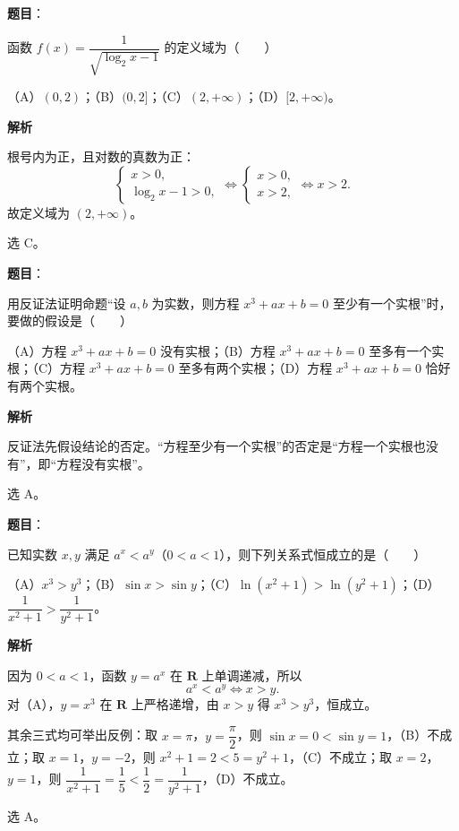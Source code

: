 \begin{answer}

\textbf{题目}：

函数 $f(x)=\dfrac1{\sqrt{\log_2x-1}}$ 的定义域为\mbox{（　　）}

（A）$(0,2)$；（B）$(0,2]$；（C）$(2,+\infty)$；（D）$[2,+\infty)$。

\textbf{解析}

根号内为正，且对数的真数为正：
\nopagebreak[4]
\[\begin{cases}x>0,\\[1mm]\log_2x-1>0,\end{cases}
\iff\begin{cases}x>0,\\x>2,\end{cases}\iff x>2 .\]
故定义域为 $(2,+\infty)$。

选 C。


\end{answer}
\begin{answer}

\textbf{题目}：

用反证法证明命题“设 $a,b$ 为实数，则方程 $x^3+ax+b=0$ 至少有一个实根”时，要做的假设是\mbox{（　　）}

（A）方程 $x^3+ax+b=0$ 没有实根；（B）方程 $x^3+ax+b=0$ 至多有一个实根；（C）方程 $x^3+ax+b=0$ 至多有两个实根；（D）方程 $x^3+ax+b=0$ 恰好有两个实根。

\textbf{解析}

反证法先假设结论的否定。“方程至少有一个实根”的否定是“方程一个实根也没有”，即“方程没有实根”。

选 A。


\end{answer}
\begin{answer}

\textbf{题目}：

已知实数 $x,y$ 满足 $a^x<a^y$（$0<a<1$），则下列关系式恒成立的是\mbox{（　　）}

（A）$x^3>y^3$；（B）$\sin x>\sin y$；（C）$\ln(x^2+1)>\ln(y^2+1)$；（D）$\dfrac1{x^2+1}>\dfrac1{y^2+1}$。

\textbf{解析}

因为 $0<a<1$，函数 $y=a^x$ 在 $\mathbf R$ 上单调递减，所以
\nopagebreak[4]
\[a^x<a^y\iff x>y .\]
对（A），$y=x^3$ 在 $\mathbf R$ 上严格递增，由 $x>y$ 得 $x^3>y^3$，恒成立。

其余三式均可举出反例：取 $x=\pi$，$y=\dfrac\pi2$，则 $\sin x=0<\sin y=1$，（B）不成立；取 $x=1$，$y=-2$，则 $x^2+1=2<5=y^2+1$，（C）不成立；取 $x=2$，$y=1$，则 $\dfrac1{x^2+1}=\dfrac15<\dfrac12=\dfrac1{y^2+1}$，（D）不成立。

选 A。


\end{answer}
